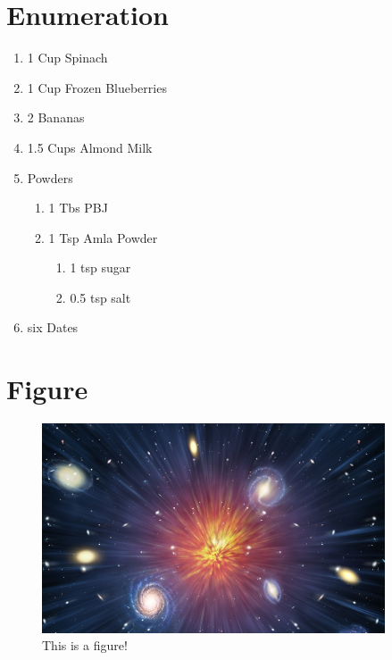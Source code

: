 \documentclass[12pt,twoside,a4paper]{article}
\begin{document}
\section{Enumeration}
\begin{enumerate}[font=\bfseries]
	\item 1 Cup Spinach
	\item 1 Cup Frozen Blueberries
	\item 2 Bananas
	\item 1.5 Cups Almond Milk
	\item Powders
	\begin{enumerate}[font=\itshape]
		\item 1 Tbs PBJ
		\item 1 Tsp Amla Powder
		\begin{enumerate}
			\item 1 tsp sugar
			\item 0.5 tsp salt
		\end{enumerate}
	\end{enumerate}
	\item six Dates
\end{enumerate}


\section{Figure}
\begin{figure}[ht] %
\centering %
\includegraphics[width=4in]{universe.jpg}
\caption{This is a figure!}
\end{figure}


\clearpage
\end{document}
